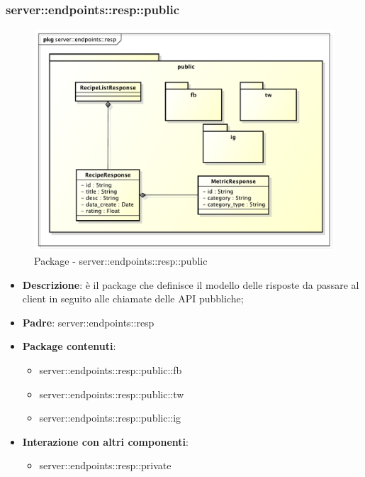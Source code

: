 \subsubsection{server::endpoints::resp::public} %
\label{ssub:bdsm_app_server_endpoints_resp_public}
\begin{figure}[!htbp]
  \centering
  \centerline{\includegraphics[scale=0.55]{./images/server/resp_public.pdf}}
  \caption{Package - server::endpoints::resp::public}
\end{figure}

\begin{itemize}
  \item \textbf{Descrizione}: è il package che definisce il modello delle risposte da passare al client in seguito alle chiamate delle API pubbliche;
  \item \textbf{Padre}: server::endpoints::resp
  \item \textbf{Package contenuti}:
    \begin{itemize}
      \item server::endpoints::resp::public::fb
      \item server::endpoints::resp::public::tw
      \item server::endpoints::resp::public::ig
  \end{itemize}
  \item \textbf{Interazione con altri componenti}:
    \begin{itemize}
      \item server::endpoints::resp::private
  \end{itemize}
\end{itemize}

